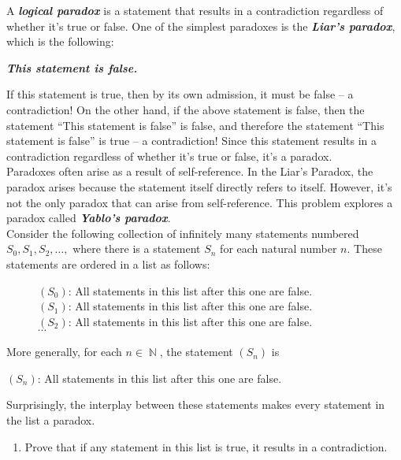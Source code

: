 \documentclass{article}
\renewcommand{\(}{\left(}
\renewcommand{\)}{\right)}
\DeclareMathOperator{\N}{\mathbb{N}}
\renewcommand{\emph}[1]{\textit{\textbf{#1}}}
\theoremstyle{plain}
\theoremstyle{plain}
\theoremstyle{definition}
\begin{document}
A \emph{logical paradox} is a statement that results in a contradiction
regardless of whether it's true or false.
One of the simplest paradoxes is the \emph{Liar's paradox},
which is the following:
\begin{center}
\emph{This statement is false.}
\end{center}
If this statement is true,
then by its own admission, it must be false -- a contradiction!
On the other hand, if the above statement is false, then the statement ``This statement is false'' is false, and therefore the
statement ``This statement is false'' is true -- a contradiction!
Since this statement results in a contradiction regardless of whether
it's true or false, it's a paradox. \\

Paradoxes often arise as a result of self-reference.
In the Liar's Paradox,
the paradox arises because the statement itself directly refers to itself.
However, it's not the only paradox that can arise from self-reference.
This problem explores a paradox called \emph{Yablo's paradox}. \\

Consider the following collection of infinitely many statements numbered
$S_0, S_1, S_2,\dots,$ where there is a statement $S_n$ for each
natural number $n$.
These statements are ordered in a list as follows:
\begin{figure}[H]
\begin{mdframed}[backgroundcolor=yellow!20] 
\begin{center}
$(S_0)$: All statements in this list after this one are false. \\
$(S_1)$: All statements in this list after this one are false. \\
$(S_2)$: All statements in this list after this one are false. \\
$\cdots$
\end{center}
\end{mdframed}
\end{figure}

More generally, for each $n \in \N$,
the statement $(S_n)$ is
\begin{center}
$(S_n)$: All statements in this list after this one are false.
\end{center}
Surprisingly,
the interplay between these statements makes every statement in the list
a paradox.

\begin{enumerate}[label*=\roman*.,ref=\roman*]

\item Prove that if any statement in this list is true, it results in a contradiction.

\end{enumerate}
\end{document}
